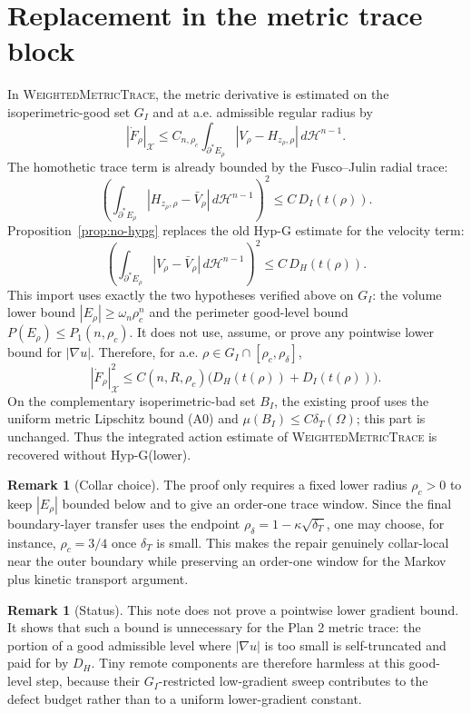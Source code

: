 \documentclass[11pt]{article}
\theoremstyle{definition}
\newtheorem{remark}[theorem]{Remark}
\newcommand{\Om}{\Omega}
\newcommand{\Hn}{\mathcal H^{n-1}}
\newcommand{\X}{\mathcal X}
\begin{document}
\section{Replacement in the metric trace block}

In \textsc{WeightedMetricTrace}, the metric derivative is estimated on
the isoperimetric-good set $G_I$ and at a.e. admissible regular radius by
\[
   |\dot F_\rho|_\X
   \le C_{n,\rho_c}\int_{\partial^*E_\rho}
      |V_\rho-H_{z_\rho,\rho}|\,d\Hn .
\]
The homothetic trace term is already bounded by the Fusco--Julin
radial trace:
\[
   \left(\int_{\partial^*E_\rho}
      |H_{z_\rho,\rho}-\bar V_\rho|\,d\Hn\right)^2
   \le C\,D_I(t(\rho)).
\]
Proposition~\ref{prop:no-hypg} replaces the old Hyp-G estimate for the
velocity term:
\[
   \left(\int_{\partial^*E_\rho}
      |V_\rho-\bar V_\rho|\,d\Hn\right)^2
   \le C\,D_H(t(\rho)).
\]
This import uses exactly the two hypotheses verified above on $G_I$:
the volume lower bound $|E_\rho|\ge\omega_n\rho_c^n$ and the
perimeter good-level bound $P(E_\rho)\le P_1(n,\rho_c)$.  It does not
use, assume, or prove any pointwise lower bound for $|\nabla u|$.
Therefore, for a.e. $\rho\in G_I\cap[\rho_c,\rho_\delta]$,
\[
   |\dot F_\rho|_\X^2
   \le C(n,R,\rho_c)\bigl(D_H(t(\rho))+D_I(t(\rho))\bigr).
\]
On the complementary isoperimetric-bad set $B_I$, the existing proof uses
the uniform metric Lipschitz bound (A0) and
$\mu(B_I)\le C\delta_T(\Om)$; this part is unchanged.  Thus the
integrated action estimate of \textsc{WeightedMetricTrace} is recovered
without Hyp-G(lower).

\begin{remark}[Collar choice]
The proof only requires a fixed lower radius $\rho_c>0$ to keep
$|E_\rho|$ bounded below and to give an order-one trace window.  Since
the final boundary-layer transfer uses the endpoint
$\rho_\delta=1-\kappa\sqrt{\delta_T}$, one may choose, for instance,
$\rho_c=3/4$ once $\delta_T$ is small.  This makes the repair genuinely
collar-local near the outer boundary while preserving an order-one
window for the Markov plus kinetic transport argument.
\end{remark}

\begin{remark}[Status]
This note does not prove a pointwise lower gradient bound.  It shows that
such a bound is unnecessary for the Plan 2 metric trace: the portion of a
good admissible level where $|\nabla u|$ is too small is self-truncated
and paid for by $D_H$.  Tiny remote components are therefore harmless at
this good-level step, because their $G_I$-restricted low-gradient sweep
contributes to the defect budget rather than to a uniform lower-gradient
constant.
\end{remark}
\end{document}
